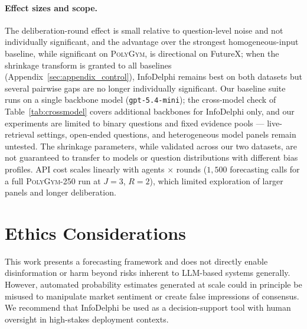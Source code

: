\paragraph{Effect sizes and scope.}
The deliberation-round effect is small relative to question-level noise and not individually significant, and the advantage over the strongest homogeneous-input baseline, while significant on \textsc{PolyGym}, is directional on FutureX; when the shrinkage transform is granted to all baselines (Appendix~\ref{sec:appendix_control}), InfoDelphi remains best on both datasets but several pairwise gaps are no longer individually significant.
Our baseline suite runs on a single backbone model (\texttt{gpt-5.4-mini}); the cross-model check of Table~\ref{tab:crossmodel} covers additional backbones for InfoDelphi only, and our experiments are limited to binary questions and fixed evidence pools --- live-retrieval settings, open-ended questions, and heterogeneous model panels remain untested.
The shrinkage parameters, while validated across our two datasets, are not guaranteed to transfer to models or question distributions with different bias profiles.
API cost scales linearly with agents $\times$ rounds ($1{,}500$ forecasting calls for a full \textsc{PolyGym}-250 run at $J{=}3$, $R{=}2$), which limited exploration of larger panels and longer deliberation.

\section*{Ethics Considerations}
This work presents a forecasting framework and does not directly enable disinformation or harm beyond risks inherent to LLM-based systems generally. However, automated probability estimates generated at scale could in principle be misused to manipulate market sentiment or create false impressions of consensus. We recommend that InfoDelphi be used as a decision-support tool with human oversight in high-stakes deployment contexts.
